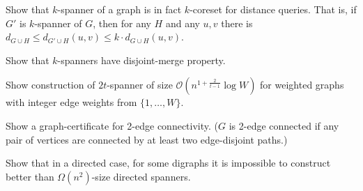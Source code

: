 \documentclass[12pt]{uebung}
\begin{document}
 

\newcommand{\bigo}{\mathcal{O}}
\renewcommand{\aufgname}{Exercise}
\begin{aufg}
Show that $k$-spanner of a graph is in fact $k$-coreset for distance queries. That is, if $G'$ is $k$-spanner of $G$, then for any $H$ and any $u,v$ there is $d_{G \cup H} \le d_{G' \cup H}(u,v) \le k \cdot d_{G \cup H}(u,v)$.
\end{aufg}

\begin{aufg}
Show that $k$-spanners have disjoint-merge property.
\end{aufg}

\begin{aufg}
Show construction of $2t$-spanner of size $\bigo(n^{1+\frac{2}{t-1}} \log W)$ for weighted graphs with integer edge weights from $\{1,\ldots,W\}$.
\end{aufg}

\begin{aufg}
Show a graph-certificate for 2-edge connectivity. ($G$ is 2-edge connected if any pair of vertices are connected by at least two edge-disjoint paths.)
\end{aufg}

\begin{aufg}
Show that in a directed case, for some digraphs it is impossible to construct better than $\Omega(n^2)$-size directed spanners.
\end{aufg}
\end{document}
